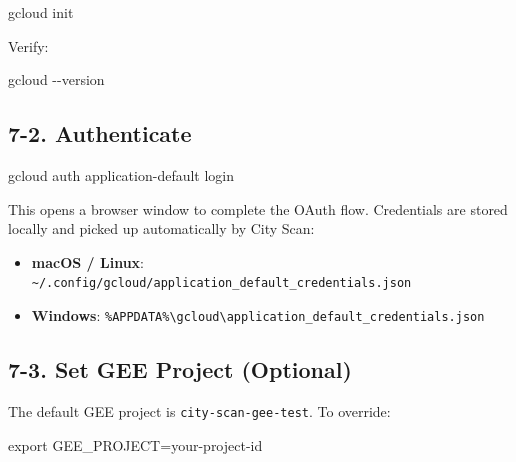 \documentclass[
  letterpaper,
  DIV=11,
  numbers=noendperiod]{scrreprt}
\newenvironment{Shaded}{\begin{snugshade}}{\end{snugshade}}
\newcommand{\AttributeTok}[1]{\textcolor[rgb]{0.40,0.45,0.13}{#1}}
\newcommand{\BuiltInTok}[1]{\textcolor[rgb]{0.00,0.23,0.31}{#1}}
\newcommand{\ExtensionTok}[1]{\textcolor[rgb]{0.00,0.23,0.31}{#1}}
\newcommand{\NormalTok}[1]{\textcolor[rgb]{0.00,0.23,0.31}{#1}}
\newcommand{\OperatorTok}[1]{\textcolor[rgb]{0.37,0.37,0.37}{#1}}
\newcommand{\VariableTok}[1]{\textcolor[rgb]{0.07,0.07,0.07}{#1}}
\providecommand{\tightlist}{%
  \setlength{\itemsep}{0pt}\setlength{\parskip}{0pt}}
\begin{document}
\begin{Shaded}
\begin{Highlighting}[]
\ExtensionTok{gcloud}\NormalTok{ init}
\end{Highlighting}
\end{Shaded}

Verify:

\begin{Shaded}
\begin{Highlighting}[]
\ExtensionTok{gcloud} \AttributeTok{{-}{-}version}
\end{Highlighting}
\end{Shaded}

\subsection{7-2. Authenticate}\label{authenticate}

\begin{Shaded}
\begin{Highlighting}[]
\ExtensionTok{gcloud}\NormalTok{ auth application{-}default login}
\end{Highlighting}
\end{Shaded}

This opens a browser window to complete the OAuth flow. Credentials are
stored locally and picked up automatically by City Scan:

\begin{itemize}
\tightlist
\item
  \textbf{macOS / Linux}:
  \texttt{\textasciitilde{}/.config/gcloud/application\_default\_credentials.json}
\item
  \textbf{Windows}:
  \texttt{\%APPDATA\%\textbackslash{}gcloud\textbackslash{}application\_default\_credentials.json}
\end{itemize}

\subsection{7-3. Set GEE Project
(Optional)}\label{set-gee-project-optional}

The default GEE project is \texttt{city-scan-gee-test}. To override:

\begin{Shaded}
\begin{Highlighting}[]
\BuiltInTok{export} \VariableTok{GEE\_PROJECT}\OperatorTok{=}\NormalTok{your{-}project{-}id}
\end{Highlighting}
\end{Shaded}
\end{document}
